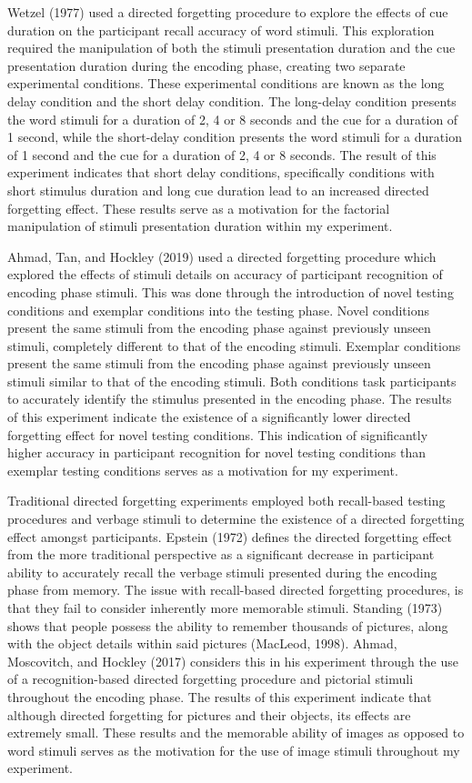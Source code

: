 \documentclass[
  english,
  man,floatsintext]{apa6}
\begin{document}
Wetzel (1977) used a directed forgetting procedure to explore the effects of cue duration on the participant recall accuracy of word stimuli. This exploration required the manipulation of both the stimuli presentation duration and the cue presentation duration during the encoding phase, creating two separate experimental conditions. These experimental conditions are known as the long delay condition and the short delay condition. The long-delay condition presents the word stimuli for a duration of 2, 4 or 8 seconds and the cue for a duration of 1 second, while the short-delay condition presents the word stimuli for a duration of 1 second and the cue for a duration of 2, 4 or 8 seconds. The result of this experiment indicates that short delay conditions, specifically conditions with short stimulus duration and long cue duration lead to an increased directed forgetting effect. These results serve as a motivation for the factorial manipulation of stimuli presentation duration within my experiment.

Ahmad, Tan, and Hockley (2019) used a directed forgetting procedure which explored the effects of stimuli details on accuracy of participant recognition of encoding phase stimuli. This was done through the introduction of novel testing conditions and exemplar conditions into the testing phase. Novel conditions present the same stimuli from the encoding phase against previously unseen stimuli, completely different to that of the encoding stimuli. Exemplar conditions present the same stimuli from the encoding phase against previously unseen stimuli similar to that of the encoding stimuli. Both conditions task participants to accurately identify the stimulus presented in the encoding phase. The results of this experiment indicate the existence of a significantly lower directed forgetting effect for novel testing conditions. This indication of significantly higher accuracy in participant recognition for novel testing conditions than exemplar testing conditions serves as a motivation for my experiment.

Traditional directed forgetting experiments employed both recall-based testing procedures and verbage stimuli to determine the existence of a directed forgetting effect amongst participants. Epstein (1972) defines the directed forgetting effect from the more traditional perspective as a significant decrease in participant ability to accurately recall the verbage stimuli presented during the encoding phase from memory. The issue with recall-based directed forgetting procedures, is that they fail to consider inherently more memorable stimuli. Standing (1973) shows that people possess the ability to remember thousands of pictures, along with the object details within said pictures (MacLeod, 1998). Ahmad, Moscovitch, and Hockley (2017) considers this in his experiment through the use of a recognition-based directed forgetting procedure and pictorial stimuli throughout the encoding phase. The results of this experiment indicate that although directed forgetting for pictures and their objects, its effects are extremely small. These results and the memorable ability of images as opposed to word stimuli serves as the motivation for the use of image stimuli throughout my experiment.
\end{document}
